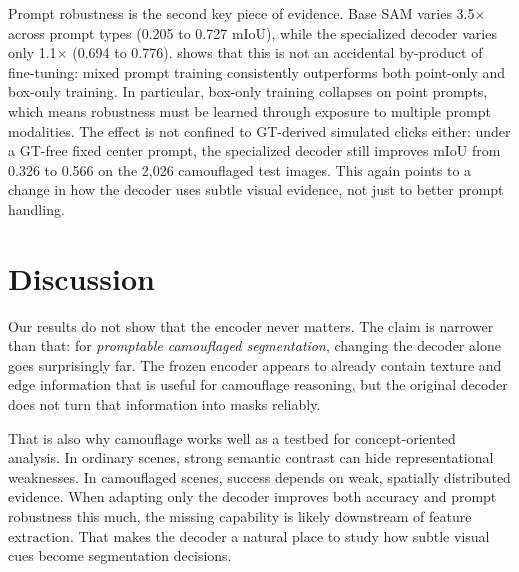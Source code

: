 \documentclass[10pt,twocolumn,letterpaper]{article}
\begin{document}
Prompt robustness is the second key piece of evidence. Base SAM varies 3.5$\times$ across prompt types (0.205 to 0.727 mIoU), while the specialized decoder varies only 1.1$\times$ (0.694 to 0.776).  shows that this is not an accidental by-product of fine-tuning: mixed prompt training consistently outperforms both point-only and box-only training. In particular, box-only training collapses on point prompts, which means robustness must be learned through exposure to multiple prompt modalities. The effect is not confined to GT-derived simulated clicks either: under a GT-free fixed center prompt, the specialized decoder still improves mIoU from 0.326 to 0.566 on the 2,026 camouflaged test images. This again points to a change in how the decoder uses subtle visual evidence, not just to better prompt handling.

\section{Discussion}
Our results do not show that the encoder never matters. The claim is narrower than that: for \emph{promptable camouflaged segmentation}, changing the decoder alone goes surprisingly far. The frozen encoder appears to already contain texture and edge information that is useful for camouflage reasoning, but the original decoder does not turn that information into masks reliably.

That is also why camouflage works well as a testbed for concept-oriented analysis. In ordinary scenes, strong semantic contrast can hide representational weaknesses. In camouflaged scenes, success depends on weak, spatially distributed evidence. When adapting only the decoder improves both accuracy and prompt robustness this much, the missing capability is likely downstream of feature extraction. That makes the decoder a natural place to study how subtle visual cues become segmentation decisions.

{\small


}
\end{document}
